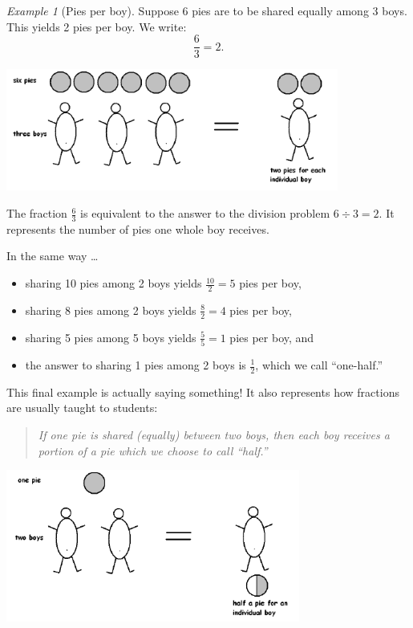 \documentclass[10pt, reqno]{amsart}
\theoremstyle{remark}
\newtheorem{example}[thm]{Example}
\theoremstyle{definition}
\numberwithin{equation}{section}  %
\begin{document}
\begin{example}[Pies per boy]
Suppose 6 pies are to be shared equally among 3 boys. This yields 2
pies per boy. We write:
\[
\frac 6 3 = 2.
\]


\begin{center}
\includegraphics[height = 4cm]{PPB1}
\end{center}

The fraction $\frac 6 3$ is equivalent to the answer to the division problem $6 \div 3 = 2$.  It represents the number of pies one whole boy receives. 
\end{example}

In the same way \dots

\begin{itemize}
\item[]
sharing 10 pies among 2 boys yields $ \frac{10}2 = 5 $ pies per boy,\\
\item[]
sharing 8 pies among 2 boys yields $ \frac{8}2 = 4 $ pies per boy,\\
\item[]
sharing 5 pies among 5 boys yields $ \frac{5}5 = 1 $ pies per boy, and\\


\item[]
the answer to sharing 1 pies among 2 boys is $ \frac{1}2 $, which we call ``one-half.''


\end{itemize}


This final example is actually saying something! It also represents how fractions are
usually taught to students:

\begin{quotation}
\emph{
If one pie is shared (equally) between two boys, then each boy receives a portion of
a pie which we choose to call ``half.''}
\end{quotation}

\begin{center}
\includegraphics[height = 5cm]{PPB2}
\end{center}
\end{document}

